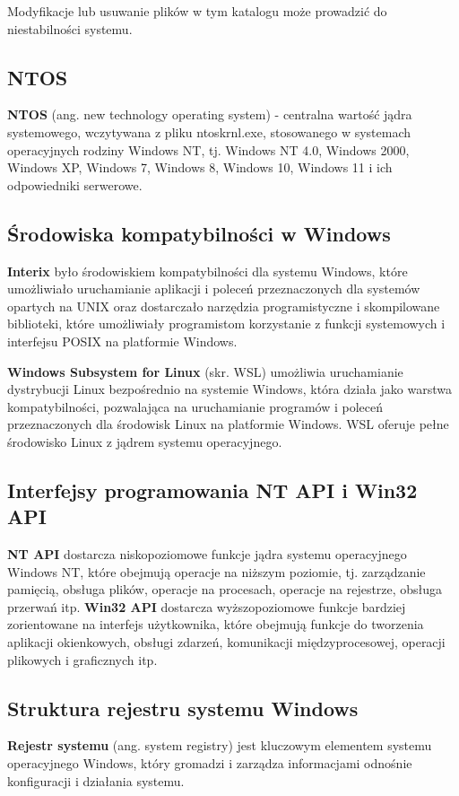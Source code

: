 \documentclass{article}
\begin{document}
Modyfikacje lub usuwanie plików w tym katalogu może prowadzić do niestabilności systemu.

\subsection{NTOS}
\textbf{NTOS} (ang. new technology operating system) - centralna wartość jądra systemowego, wczytywana z pliku ntoskrnl.exe, stosowanego w systemach operacyjnych rodziny Windows NT, tj. Windows NT 4.0, Windows 2000, Windows XP, Windows 7, Windows 8, Windows 10, Windows 11 i ich odpowiedniki serwerowe.

\subsection{Środowiska kompatybilności w Windows}
\textbf{Interix} było środowiskiem kompatybilności dla systemu Windows, które umożliwiało uruchamianie aplikacji i poleceń przeznaczonych dla systemów opartych na UNIX oraz dostarczało narzędzia programistyczne i skompilowane biblioteki, które umożliwiały programistom korzystanie z funkcji systemowych i interfejsu POSIX na platformie Windows.

\textbf{Windows Subsystem for Linux} (skr. WSL) umożliwia uruchamianie dystrybucji Linux bezpośrednio na systemie Windows, która działa jako warstwa kompatybilności, pozwalająca na uruchamianie programów i poleceń przeznaczonych dla środowisk Linux na platformie Windows. WSL oferuje pełne środowisko Linux z jądrem systemu operacyjnego.

\subsection{Interfejsy programowania NT API i Win32 API}
\textbf{NT API} dostarcza niskopoziomowe funkcje jądra systemu operacyjnego Windows NT, które obejmują operacje na niższym poziomie, tj. zarządzanie pamięcią, obsługa plików, operacje na procesach, operacje na rejestrze, obsługa przerwań itp.
\textbf{Win32 API} dostarcza wyższopoziomowe funkcje bardziej zorientowane na interfejs użytkownika, które obejmują funkcje do tworzenia aplikacji okienkowych, obsługi zdarzeń, komunikacji międzyprocesowej, operacji plikowych i graficznych itp.

\subsection{Struktura rejestru systemu Windows}
\textbf{Rejestr systemu} (ang. system registry) jest kluczowym elementem systemu operacyjnego Windows, który gromadzi i zarządza informacjami odnośnie konfiguracji i działania systemu.
\end{document}
